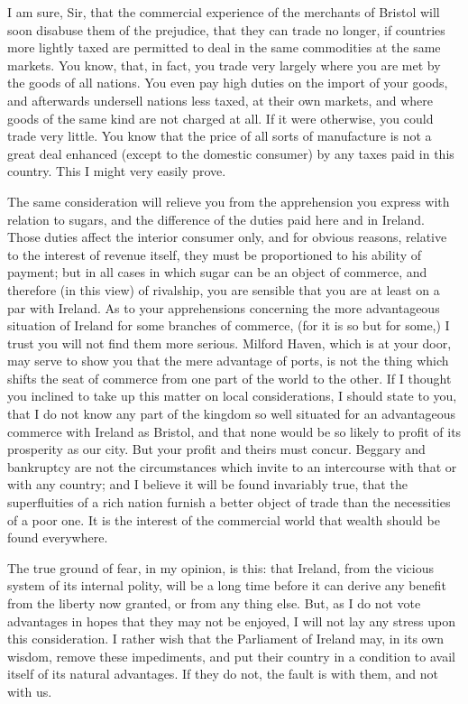 I am sure, Sir, that the commercial experience of the merchants of Bristol will soon disabuse them of the prejudice, that they can trade no longer, if countries more lightly taxed are permitted to deal in the same commodities at the same markets. You know, that, in fact, you trade very largely where you are met by the goods of all nations. You even pay high duties on the import of your goods, and afterwards undersell nations less taxed, at their own markets, and where goods of the same kind are not charged at all. If it were otherwise, you could trade very little. You know that the price of all sorts of manufacture is not a great deal enhanced (except to the domestic consumer) by any taxes paid in this country. This I might very easily prove.

The same consideration will relieve you from the apprehension you express with relation to sugars, and the difference of the duties paid here and in Ireland. Those duties affect the interior consumer only, and for obvious reasons, relative to the interest of revenue itself, they must be proportioned to his ability of payment; but in all cases in which sugar can be an object of commerce, and therefore (in this view) of rivalship, you are sensible that you are at least on a par with Ireland. As to your apprehensions concerning the more advantageous situation of Ireland for some branches of commerce, (for it is so but for some,) I trust you will not find them more serious. Milford Haven, which is at your door, may serve to show you that the mere advantage of ports, is not the thing which shifts the seat of commerce from one part of the world to the other. If I thought you inclined to take up this matter on local considerations, I should state to you, that I do not know any part of the kingdom so well situated for an advantageous commerce with Ireland as Bristol, and that none would be so likely to profit of its prosperity as our city. But your profit and theirs must concur. Beggary and bankruptcy are not the circumstances which invite to an intercourse with that or with any country; and I believe it will be found invariably true, that the superfluities of a rich nation furnish a better object of trade than the necessities of a poor one. It is the interest of the commercial world that wealth should be found everywhere.

The true ground of fear, in my opinion, is this: that Ireland, from the vicious system of its internal polity, will be a long time before it can derive any benefit from the liberty now granted, or from any thing else. But, as I do not vote advantages in hopes that they may not be enjoyed, I will not lay any stress upon this consideration. I rather wish that the Parliament of Ireland may, in its own wisdom, remove these impediments, and put their country in a condition to avail itself of its natural advantages. If they do not, the fault is with them, and not with us.

